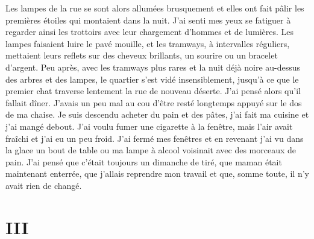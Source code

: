 \documentclass[french,twoside]{book} %
\newcommand\chapteropen{} %
\newcommand\chapterclose{} %
\begin{document}
Les lampes de la rue se sont alors allumées brusquement et elles ont fait pâlir les premières étoiles qui montaient dans la nuit. J'ai senti mes yeux se fatiguer à regarder ainsi les trottoirs avec leur chargement d’hommes et de lumières. Les lampes faisaient luire le pavé mouille, et les tramways, à intervalles réguliers, mettaient leurs reflets sur des cheveux brillants, un sourire ou un bracelet d’argent. Peu après, avec les tramways plus rares et la nuit déjà noire au-dessus des arbres et des lampes, le quartier s’est vidé insensiblement, jusqu’à ce que le premier chat traverse lentement la rue de nouveau déserte. J'ai pensé alors qu’il fallait dîner. J'avais un peu mal au cou d’être resté longtemps appuyé sur le dos de ma chaise. Je suis descendu acheter du pain et des pâtes, j’ai fait ma cuisine et j’ai mangé debout. J'ai voulu fumer une cigarette à la fenêtre, mais l’air avait fraîchi et j’ai eu un peu froid. J'ai fermé mes fenêtres et en revenant j’ai vu dans la glace un bout de table ou ma lampe à alcool voisinait avec des morceaux de pain. J'ai pensé que c’était toujours un dimanche de tiré, que maman était maintenant enterrée, que j’allais reprendre mon travail et que, somme toute, il n’y avait rien de changé.
\chapterclose


\chapteropen
\chapter[{III}]{III}
\label{I3}
\end{document}

